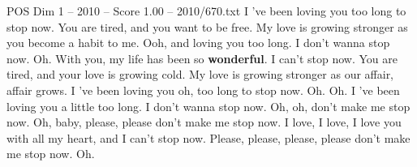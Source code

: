 \begin{textsample}{POS Dim 1 – 2010 – Score 1.00 – 2010/670.txt}  \label{ex:f1_pos_022}
I 've been loving you too long to stop now.
You are tired, and you want to be free.
My love is growing stronger as you become a habit to me.
Ooh, and loving you too long.
I don't wanna stop now.
Oh.
With you, my life has been so \textbf{wonderful}.
I can't stop now.
You are tired, and your love is growing cold.
My love is growing stronger as our affair, affair grows.
I 've been loving you oh, too long to stop now.
Oh.
Oh.
I 've been loving you a little too long.
I don't wanna stop now.
Oh, oh, don't make me stop now.
Oh, baby, please, please don't make me stop now.
I love, I love, I love you with all my heart, and I can't stop now.
Please, please, please, please don't make me stop now.
Oh.

\end{textsample}
